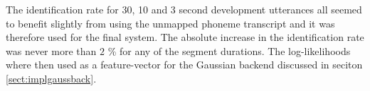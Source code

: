 The identification rate for 30, 10 and 3 second development utterances all seemed to benefit slightly from using the unmapped phoneme transcript and it was therefore used for the final system. The absolute increase in the identification rate was never more than $2$ \% for any of the segment durations. The log-likelihoods where then used as a feature-vector for the Gaussian backend discussed in seciton \ref{sect:implgaussback}.